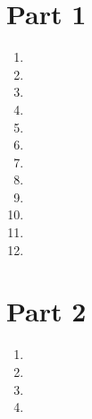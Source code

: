 \documentclass[basic, header]{nosvagor-notes}
\begin{document}
\section{Part 1}
\begin{enumerate}[label=(\alph*)]
  \item
  \item
  \item
  \item
  \item
  \item
  \item
  \item
  \item
  \item
  \item
  \item

\end{enumerate}

\section{Part 2}
\begin{enumerate}[label=(\alph*)]
  \item
  \item
  \item
  \item

\end{enumerate}
\end{document}
